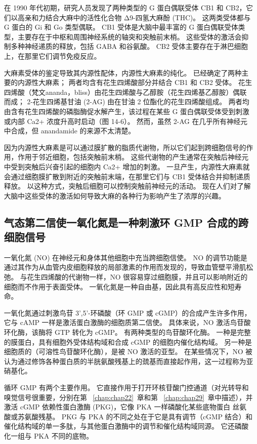 在 1990 年代初期，研究人员发现了两种类型的 G 蛋白偶联受体 CB1 和 CB2，它们以高亲和力结合大麻中的活性化合物 Δ9-四氢大麻酚 (THC)。
这两类受体都与 G 蛋白的 Gi 和 Go 类型偶联。
CB1 受体是大脑中最丰富的 G 蛋白偶联受体类型，主要存在于中枢和周围神经系统的轴突和突触前末梢。
这些受体的激活会抑制多种神经递质的释放，包括 GABA 和谷氨酸。
CB2 受体主要存在于淋巴细胞上，在那里它们调节免疫反应。


大麻素受体的鉴定导致其内源性配体，内源性大麻素的纯化。
已经确定了两种主要的内源性大麻素；
两者均含有花生四烯酸部分并结合 CB1 和 CB2 受体。 
花生四烯酸（梵文ananda，bliss）由花生四烯酸与乙醇胺（花生四烯基乙醇胺）偶联而成；
2-花生四烯基甘油 (2-AG) 由在甘油 2 位酯化的花生四烯酸组成。
两者均由含有花生四烯酸的磷脂酶促水解产生，该过程在某些 G 蛋白偶联受体受到刺激或内部 Ca2+ 浓度升高时启动（图 14-6）。
然而，虽然 2-AG 在几乎所有神经元中合成，但 anandamide 的来源不太清楚。


因为内源性大麻素是可以通过膜扩散的脂质代谢物，所以它们起到跨细胞信号的作用，作用于邻近细胞，包括突触前末梢。
这些代谢物的产生通常在突触后神经元中受到突触后兴奋引起的细胞内 Ca2+ 增加的刺激。
一旦产生，内源性大麻素就会通过细胞膜扩散到附近的突触前末端，在那里它们与 CB1 受体结合并抑制递质释放。
以这种方式，突触后细胞可以控制突触前神经元的活动。 
现在人们对了解大脑中这些受体的激活如何导致大麻的各种行为影响产生了浓厚的兴趣。



\subsection{气态第二信使一氧化氮是一种刺激环 GMP 合成的跨细胞信号}

一氧化氮 (NO) 在神经元和身体其他细胞中充当跨细胞信使。
NO 的调节功能是通过其作为从血管内皮细胞释放的局部激素的作用而发现的，导致血管壁平滑肌松弛。
与花生四烯酸的代谢物一样，NO 很容易穿过细胞膜，并且可以影响附近的细胞而不作用于表面受体。
一氧化氮是一种自由基，因此具有高反应性和短寿命。


一氧化氮通过刺激鸟苷 3',5'-环磷酸（环 GMP 或 cGMP）的合成产生许多作用，它与 cAMP 一样是激活蛋白激酶的细胞质第二信使。
具体来说，NO 激活鸟苷酸环化酶，该酶将 GTP 转化为 cGMP。
有两种类型的鸟苷酸环化酶。 
一种是完整的膜蛋白，具有细胞外受体结构域和合成 cGMP 的细胞内催化结构域。
另一种是细胞质的（可溶性鸟苷酸环化酶），是被 NO 激活的亚型。
在某些情况下，NO 被认为通过修饰各种蛋白质的半胱氨酸残基上的巯基而直接起作用，这一过程称为亚硝基化。


循环 GMP 有两个主要作用。 它直接作用于打开环核苷酸门控通道（对光转导和嗅觉信号很重要，分别在第 ~\ref{chap:chap22}~章和第 ~\ref{chap:chap29}~章中描述），并激活 cGMP 依赖性蛋白激酶 (PKG)，它像 PKA 一样磷酸化某些底物蛋白 丝氨酸或苏氨酸残基。
PKG 与 PKA 的不同之处在于它是具有调节（cGMP 结合）和催化结构域的单一多肽，与其他蛋白激酶中的调节和催化结构域同源。
它还磷酸化一组与 PKA 不同的底物。


